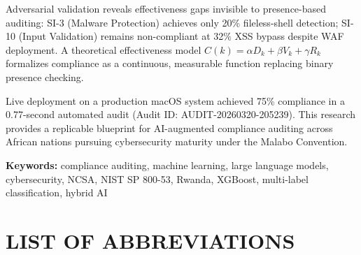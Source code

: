 \documentclass[12pt,oneside]{report}
\begin{document}
Adversarial validation reveals effectiveness gaps invisible to presence-based auditing: SI-3 (Malware Protection) achieves only 20\% fileless-shell detection; SI-10 (Input Validation) remains non-compliant at 32\% XSS bypass despite WAF deployment. A theoretical effectiveness model $C(k) = \alpha D_k + \beta V_k + \gamma R_k$ formalizes compliance as a continuous, measurable function replacing binary presence checking.

Live deployment on a production macOS system achieved 75\% compliance in a 0.77-second automated audit (Audit ID: AUDIT-20260320-205239). This research provides a replicable blueprint for AI-augmented compliance auditing across African nations pursuing cybersecurity maturity under the Malabo Convention.

\textbf{Keywords:} compliance auditing, machine learning, large language models, cybersecurity, NCSA, NIST SP 800-53, Rwanda, XGBoost, multi-label classification, hybrid AI

\newpage
\tableofcontents

\newpage
\listoffigures
{}

\newpage
\listoftables
{}

\newpage
\chapter*{LIST OF ABBREVIATIONS}
\end{document}
